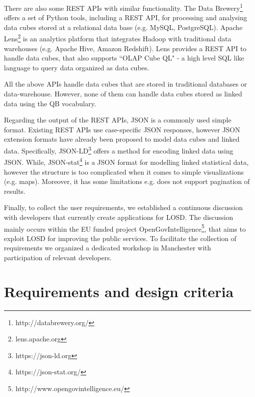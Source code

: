 \documentclass{llncs}
\begin{document}
There are also some REST APIs with similar functionality. The Data Brewery\footnote{http://databrewery.org/} offers a set of Python tools, including a REST API, for processing and analysing data cubes stored at a relational data base (e.g. MySQL, PostgreSQL). Apache Lens\footnote{lens.apache.org} is an analytics platform that integrates Hadoop with traditional data warehouses (e.g. Apache Hive, Amazon Redshift). Lens provides a REST API to handle data cubes, that also supports ``OLAP Cube QL" - a high level SQL like language to query data organized as data cubes.

All the above APIs handle data cubes that are stored in traditional databases or data-warehouse. However, none of them can handle data cubes  stored as linked data using the QB vocabulary.  

Regarding the output of the REST APIs, JSON is a commonly used simple format. Existing REST APIs use 
case-specific JSON responses, however JSON extension formats have already been proposed to model data cubes and linked data. Specifically, JSON-LD\footnote{https://json-ld.org} offers a method for encoding linked data using JSON. While, JSON-stat\footnote{https://json-stat.org/} is a JSON format for modelling linked statistical data, however the structure is too complicated when it comes to simple visualizations (e.g. maps). Moreover, it has some limitations e.g. does not support pagination of results. 

Finally, to collect the user requirements, we established a continuous discussion with developers that currently create applications for LOSD. The discussion mainly occurs within the EU funded project OpenGovIntelligence\footnote{http://www.opengovintelligence.eu/}, that aims to exploit LOSD for improving the public services. To facilitate the collection of requirements we organized a dedicated workshop in Manchester with participation of relevant developers. 


\section{Requirements and design criteria}\label{sec:reqs}
\end{document}

